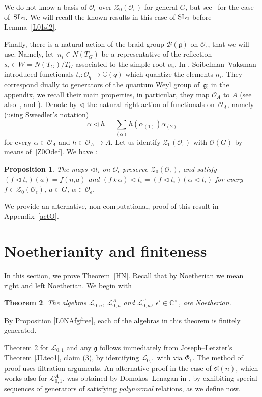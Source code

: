 \documentclass[10pt,a4paper]{amsart}
\numberwithin{equation}{section}
\newtheorem{teo}{Theorem}[section]
\newtheorem{prop}[teo]{Proposition}
\theoremstyle{definition}
\newcommand{\e}{\epsilon}
\newcommand{\ep}{{\epsilon'}}
\newcommand{\mc}{\mathbb{C}}
\newcommand{\Ll}{{\mathcal L}}
\newcommand{\Oo}{{\mathcal O}}
\newcommand{\ra}{\rightarrow}
\begin{document}
We do not know a basis of $\Oo_\e$ over $\mathcal{Z}_0(\Oo_\e)$ for general $G$, but see~\cite{DRZ} for the case of~${\rm SL}_2$. We will recall the known results in this case of ${\rm SL}_2$ before Lemma~\ref{L01sl2}.

Finally, there is a natural action of the braid group $\mathcal{B}(\mathfrak{g})$ on $\Oo_\e$, that we will use. Namely, let~${n_i\in N(T_G)}$ be a representative of the reflection $s_i\in W=N(T_G)/T_G$ associated to the simple root $\alpha_i$. In \cite{Soi,SV}, Soibelman--Vaksman introduced functionals $t_i\colon \mathcal{O}_q\ra \mc(q)$ which quantize the elements $n_i$. They correspond dually to generators of the quantum Weyl group of~$\mathfrak{g}$; in the appendix, we recall their main properties, in particular, they map $\Oo_A$ to $A$ (see also~\cite[Section~8.2]{CP}, and \cite{DC-L,KhorTol,KirRes,LS,SV}). Denote by $\lhd$ the natural right action of functionals on~$\Oo_A$, namely (using Sweedler's notation)
\[\alpha\lhd h = \sum_{(\alpha)}h(\alpha_{(1)}) \alpha_{(2)}\]
for every $\alpha\in \Oo_A$ and $h\in \Oo_A\ra A$. Let us identify $\mathcal{Z}_0(\Oo_\e)$ with $\Oo(G)$ by means of~\eqref{Z0Odef}. We have \cite[Proposition~7.1]{DC-L}:

\begin{prop} \label{funcDCL} The maps $\lhd t_i$ on $\Oo_\e$ preserve $\mathcal{Z}_0(\Oo_\e)$, and satisfy $(f\lhd t_i)(a) = f(n_ia)$ and $(f\star\alpha)\lhd t_i = (f\lhd t_i)(\alpha\lhd t_i)$ for every $f\in \mathcal{Z}_0(\Oo_\e)$, $a\in G$, $\alpha\in \mathcal{O}_\e$.
\end{prop}

We provide an alternative, non computational, proof of this result in Appendix~\ref{actO}.

\section{Noetherianity and finiteness}\label{HNsec}
In this section, we prove Theorem~\ref{HN}. Recall that by Noetherian we mean right and left Noetherian. We begin with

\begin{teo} \label{LonNoeth} The algebras ${\mathcal L}_{0,n}$, $\Ll_{0,n}^A$ and $\Ll_{0,n}^\ep$, $\ep\in \mc^\times$, are Noetherian.
\end{teo}

By Proposition \ref{L0NAfgfree}, each of the algebras in this theorem is finitely generated.

Theorem \ref{LonNoeth} for ${\mathcal L}_{0,1}$ and any $\mathfrak{g}$ follows immediately from Joseph--Letzter's Theorem \ref{JLteo1}, claim (3), by identifying ${\mathcal L}_{0,1}$ with  via $\Phi_1$. The method of proof uses filtration arguments. An alternative proof in the case of $\mathfrak{sl}(n)$, which works also for ${\mathcal L}_{0,1}^A$, was obtained by Domokos--Lenagan in \cite{DomLen}, by exhibiting special sequences of generators of  satisfying {\it polynormal} relations, as we define now.
\end{document}
